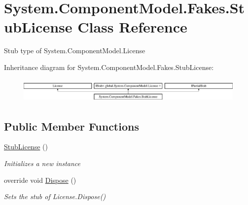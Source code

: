 \hypertarget{class_system_1_1_component_model_1_1_fakes_1_1_stub_license}{\section{System.\-Component\-Model.\-Fakes.\-Stub\-License Class Reference}
\label{class_system_1_1_component_model_1_1_fakes_1_1_stub_license}
}


Stub type of System.\-Component\-Model.\-License 


Inheritance diagram for System.\-Component\-Model.\-Fakes.\-Stub\-License\-:\begin{figure}[H]
\begin{center}
\leavevmode
\includegraphics[height=1.244444cm]{class_system_1_1_component_model_1_1_fakes_1_1_stub_license}
\end{center}
\end{figure}
\subsection*{Public Member Functions}
\begin{DoxyCompactItemize}
\item 
\hyperlink{class_system_1_1_component_model_1_1_fakes_1_1_stub_license_ace751501d06b388f522af02eb5d88e1b}{Stub\-License} ()
\begin{DoxyCompactList}\small\item\em Initializes a new instance\end{DoxyCompactList}\item 
override void \hyperlink{class_system_1_1_component_model_1_1_fakes_1_1_stub_license_a59bef301c1f78c0ceb51f4809f5acf85}{Dispose} ()
\begin{DoxyCompactList}\small\item\em Sets the stub of License.\-Dispose()\end{DoxyCompactList}\end{DoxyCompactItemize}
